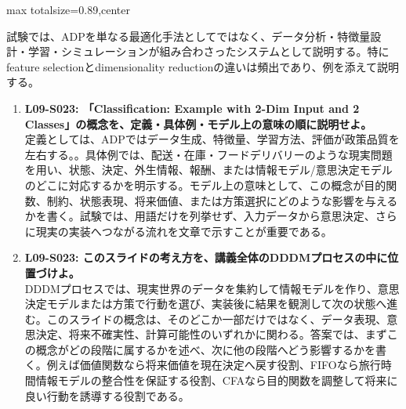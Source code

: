 \begin{minipage}[t]{0.58\textwidth}
\begin{adjustbox}{max totalsize={\textwidth}{0.89\textheight},center}
\begin{minipage}{\textwidth}
試験では、ADPを単なる最適化手法としてではなく、データ分析・特徴量設計・学習・シミュレーションが組み合わさったシステムとして説明する。特にfeature selectionとdimensionality reductionの違いは頻出であり、例を添えて説明する。\par{}\begin{enumerate}\item \textbf{L09-S023: 「Classification: Example with 2-Dim Input and 2 Classes」の概念を、定義・具体例・モデル上の意味の順に説明せよ。}\\定義としては、ADPではデータ生成、特徴量、学習方法、評価が政策品質を左右する。。具体例では、配送・在庫・フードデリバリーのような現実問題を用い、状態、決定、外生情報、報酬、または情報モデル/意思決定モデルのどこに対応するかを明示する。モデル上の意味として、この概念が目的関数、制約、状態表現、将来価値、または方策選択にどのような影響を与えるかを書く。試験では、用語だけを列挙せず、入力データから意思決定、さらに現実の実装へつながる流れを文章で示すことが重要である。\item \textbf{L09-S023: このスライドの考え方を、講義全体のDDDMプロセスの中に位置づけよ。}\\DDDMプロセスでは、現実世界のデータを集約して情報モデルを作り、意思決定モデルまたは方策で行動を選び、実装後に結果を観測して次の状態へ進む。このスライドの概念は、そのどこか一部だけではなく、データ表現、意思決定、将来不確実性、計算可能性のいずれかに関わる。答案では、まずこの概念がどの段階に属するかを述べ、次に他の段階へどう影響するかを書く。例えば価値関数なら将来価値を現在決定へ戻す役割、FIFOなら旅行時間情報モデルの整合性を保証する役割、CFAなら目的関数を調整して将来に良い行動を誘導する役割である。\end{enumerate}
\end{minipage}
\end{adjustbox}
\end{minipage}


